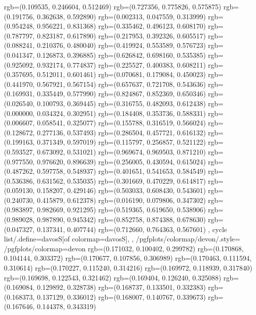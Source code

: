 {{{					rgb=(0.109535, 0.246604, 0.512469)
					rgb=(0.727356, 0.775826, 0.575875)
					rgb=(0.191756, 0.362638, 0.592890)
					rgb=(0.002313, 0.047559, 0.313999)
					rgb=(0.954248, 0.956221, 0.831368)
					rgb=(0.335462, 0.496123, 0.608170)
					rgb=(0.787797, 0.823187, 0.617890)
					rgb=(0.217953, 0.392326, 0.605517)
					rgb=(0.088241, 0.210376, 0.480040)
					rgb=(0.419924, 0.553589, 0.576723)
					rgb=(0.041347, 0.126873, 0.396885)
					rgb=(0.626842, 0.698160, 0.535385)
					rgb=(0.925092, 0.932174, 0.774837)
					rgb=(0.225527, 0.400383, 0.608211)
					rgb=(0.357695, 0.512011, 0.601461)
					rgb=(0.070681, 0.179084, 0.450023)
					rgb=(0.441970, 0.567921, 0.567154)
					rgb=(0.657637, 0.721708, 0.543636)
					rgb=(0.169931, 0.335449, 0.577990)
					rgb=(0.824867, 0.852369, 0.650346)
					rgb=(0.026540, 0.100793, 0.369445)
					rgb=(0.316755, 0.482093, 0.612438)
					rgb=(0.000000, 0.034324, 0.302951)
					rgb=(0.184408, 0.353736, 0.588331)
					rgb=(0.006607, 0.058541, 0.325077)
					rgb=(0.155788, 0.316519, 0.566024)
					rgb=(0.128672, 0.277136, 0.537493)
					rgb=(0.286504, 0.457721, 0.616132)
					rgb=(0.199163, 0.371349, 0.597019)
					rgb=(0.115797, 0.256857, 0.521122)
					rgb=(0.593527, 0.673092, 0.531021)
					rgb=(0.969674, 0.969503, 0.871210)
					rgb=(0.977550, 0.976620, 0.896639)
					rgb=(0.256005, 0.430594, 0.615024)
					rgb=(0.487262, 0.597758, 0.548937)
					rgb=(0.401651, 0.541653, 0.584549)
					rgb=(0.536386, 0.631562, 0.535035)
					rgb=(0.301669, 0.470229, 0.614817)
					rgb=(0.059130, 0.158207, 0.429146)
					rgb=(0.503033, 0.608430, 0.543601)
					rgb=(0.240730, 0.415879, 0.612378)
					rgb=(0.016190, 0.079806, 0.347302)
					rgb=(0.983897, 0.982669, 0.921295)
					rgb=(0.519365, 0.619650, 0.538906)
					rgb=(0.989028, 0.987890, 0.945342)
					rgb=(0.852758, 0.874388, 0.678630)
					rgb=(0.047327, 0.137341, 0.407744)
					rgb=(0.712660, 0.764363, 0.567601)
			},
		cycle list/.define={davosS}{[of colormap=davosS]},
		},
		/pgfplots/colormap/devon/.style={
			/pgfplots/colormap={devon}{%
					rgb=(0.171032, 0.100402, 0.299782)
					rgb=(0.170868, 0.104144, 0.303372)
					rgb=(0.170677, 0.107856, 0.306989)
					rgb=(0.170463, 0.111594, 0.310614)
					rgb=(0.170227, 0.115240, 0.314216)
					rgb=(0.169972, 0.118939, 0.317840)
					rgb=(0.169698, 0.122543, 0.321462)
					rgb=(0.169404, 0.126240, 0.325088)
					rgb=(0.169084, 0.129892, 0.328738)
					rgb=(0.168737, 0.133501, 0.332383)
					rgb=(0.168373, 0.137129, 0.336012)
					rgb=(0.168007, 0.140767, 0.339673)
					rgb=(0.167646, 0.144378, 0.343319)
}}}
